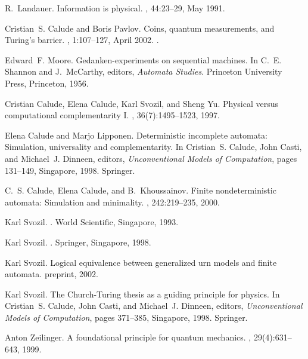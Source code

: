 \begin{thebibliography}{10}

R.~Landauer.
\newblock Information is physical.
, 44:23--29, May 1991.

Cristian~S. Calude and Boris Pavlov.
\newblock Coins, quantum measurements, and {T}uring's barrier.
, 1:107--127, April 2002.
.

Edward~F. Moore.
\newblock Gedanken-experiments on sequential machines.
\newblock In C.~E. Shannon and J.~McCarthy, editors, {\em Automata Studies}.
  Princeton University Press, Princeton, 1956.

Cristian Calude, Elena Calude, Karl Svozil, and Sheng Yu.
\newblock Physical versus computational complementarity {I}.
, 36(7):1495--1523,
  1997.

Elena Calude and Marjo Lipponen.
\newblock Deterministic incomplete automata: Simulation, universality and
  complementarity.
\newblock In Cristian~S. Calude, John Casti, and Michael~J. Dinneen, editors,
  {\em Unconventional Models of Computation}, pages 131--149, Singapore, 1998.
  Springer.

C.~S. Calude, Elena Calude, and B.~Khoussainov.
\newblock Finite nondeterministic automata: {S}imulation and minimality.
, 242:219--235, 2000.

Karl Svozil.
.
\newblock World Scientific, Singapore, 1993.

Karl Svozil.
.
\newblock Springer, Singapore, 1998.

Karl Svozil.
\newblock Logical equivalence between generalized urn models and finite
  automata.
\newblock preprint, 2002.

Karl Svozil.
\newblock The {C}hurch-{T}uring thesis as a guiding principle for physics.
\newblock In Cristian~S. Calude, John Casti, and Michael~J. Dinneen, editors,
  {\em Unconventional Models of Computation}, pages 371--385, Singapore, 1998.
  Springer.

Anton Zeilinger.
\newblock A foundational principle for quantum mechanics.
, 29(4):631--643, 1999.


\end{thebibliography}
